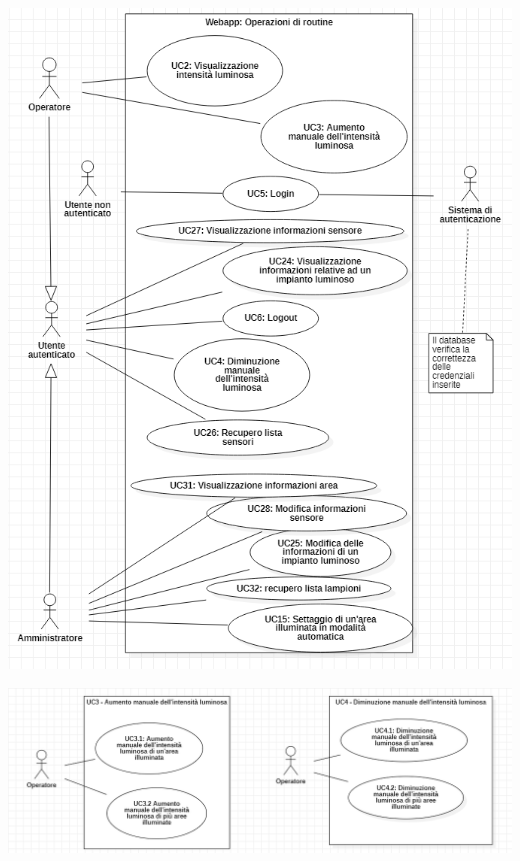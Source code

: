 \documentclass[a4paper, 12pt]{article}
\begin{document}
\includegraphics[scale=0.7]{diagramma_use_case_5.png}

\includegraphics[scale=0.60]{diagramma_use_case_6e7.png}
\end{document}
